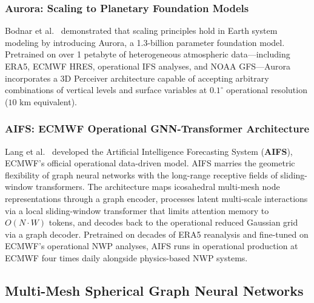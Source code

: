 \subsubsection{Aurora: Scaling to Planetary Foundation Models}
Bodnar et al.~\cite{bodnar2024aurora} demonstrated that scaling principles hold in Earth system modeling by introducing Aurora, a 1.3-billion parameter foundation model. Pretrained on over 1 petabyte of heterogeneous atmospheric data---including ERA5, ECMWF HRES, operational IFS analyses, and NOAA GFS---Aurora incorporates a 3D Perceiver architecture capable of accepting arbitrary combinations of vertical levels and surface variables at $0.1^\circ$ operational resolution ($10\text{ km}$ equivalent).

\subsubsection{AIFS: ECMWF Operational GNN-Transformer Architecture}
Lang et al.~\cite{lang2024aifs} developed the Artificial Intelligence Forecasting System (\textbf{AIFS}), ECMWF's official operational data-driven model. AIFS marries the geometric flexibility of graph neural networks with the long-range receptive fields of sliding-window transformers. The architecture maps icosahedral multi-mesh node representations through a graph encoder, processes latent multi-scale interactions via a local sliding-window transformer that limits attention memory to $O(N \cdot W)$ tokens, and decodes back to the operational reduced Gaussian grid via a graph decoder. Pretrained on decades of ERA5 reanalysis and fine-tuned on ECMWF's operational NWP analyses, AIFS runs in operational production at ECMWF four times daily alongside physics-based NWP systems.

\subsection{Multi-Mesh Spherical Graph Neural Networks}

